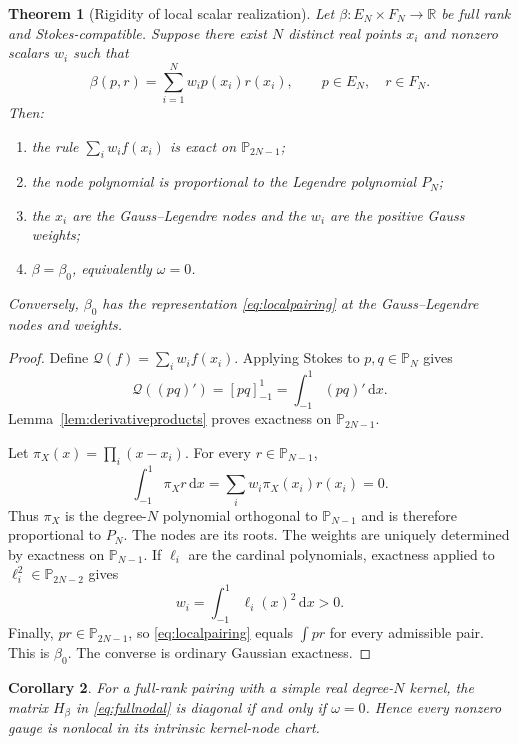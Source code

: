 \documentclass[11pt,a4paper]{article}
\newtheorem{theorem}{Theorem}[section]
\newtheorem{corollary}[theorem]{Corollary}
\theoremstyle{definition}
\theoremstyle{remark}
\newcommand{\R}{\mathbb{R}}
\newcommand{\Pp}{\mathbb{P}}
\newcommand{\dd}{\,\mathrm{d}}
\newcommand{\bracket}[1]{\left[#1\right]_{-1}^{1}}
\begin{document}
\begin{theorem}[Rigidity of local scalar realization]\label{thm:localrigidity}
Let $\beta:E_N\times F_N\to\R$ be full rank and Stokes-compatible.  Suppose there exist
$N$ distinct real points $x_i$ and nonzero scalars $w_i$ such that
\begin{equation}\label{eq:localpairing}
 \beta(p,r)=\sum_{i=1}^Nw_i p(x_i)r(x_i),
 \qquad p\in E_N,\quad r\in F_N.
\end{equation}
Then:
\begin{enumerate}[label=\textup{(\roman*)}]
\item the rule $\sum_iw_if(x_i)$ is exact on $\Pp_{2N-1}$;
\item the node polynomial is proportional to the Legendre polynomial $P_N$;
\item the $x_i$ are the Gauss--Legendre nodes and the $w_i$ are the positive Gauss weights;
\item $\beta=\beta_0$, equivalently $\omega=0$.
\end{enumerate}
Conversely, $\beta_0$ has the representation \eqref{eq:localpairing} at the Gauss--Legendre
nodes and weights.
\end{theorem}

\begin{proof}
Define $\mathcal Q(f)=\sum_iw_if(x_i)$.  Applying Stokes to $p,q\in\Pp_N$ gives
\[
 \mathcal Q((pq)')=\bracket{pq}=\int_{-1}^{1}(pq)'\dd x.
\]
Lemma~\ref{lem:derivativeproducts} proves exactness on $\Pp_{2N-1}$.

Let $\pi_X(x)=\prod_i(x-x_i)$.  For every $r\in\Pp_{N-1}$,
\[
 \int_{-1}^{1}\pi_Xr\dd x
 =\sum_iw_i\pi_X(x_i)r(x_i)=0.
\]
Thus $\pi_X$ is the degree-$N$ polynomial orthogonal to $\Pp_{N-1}$ and is therefore
proportional to $P_N$.  The nodes are its roots.  The weights are uniquely determined by
exactness on $\Pp_{N-1}$.  If $\ell_i$ are the cardinal polynomials, exactness applied to
$\ell_i^2\in\Pp_{2N-2}$ gives
\[
 w_i=\int_{-1}^{1}\ell_i(x)^2\dd x>0.
\]
Finally, $pr\in\Pp_{2N-1}$, so \eqref{eq:localpairing} equals $\int pr$ for every admissible
pair.  This is $\beta_0$.  The converse is ordinary Gaussian exactness.
\end{proof}

\begin{corollary}\label{cor:diagonaliffzero}
For a full-rank pairing with a simple real degree-$N$ kernel, the matrix $H_\beta$ in
\eqref{eq:fullnodal} is diagonal if and only if $\omega=0$.  Hence every nonzero gauge is
nonlocal in its intrinsic kernel-node chart.
\end{corollary}
\end{document}
